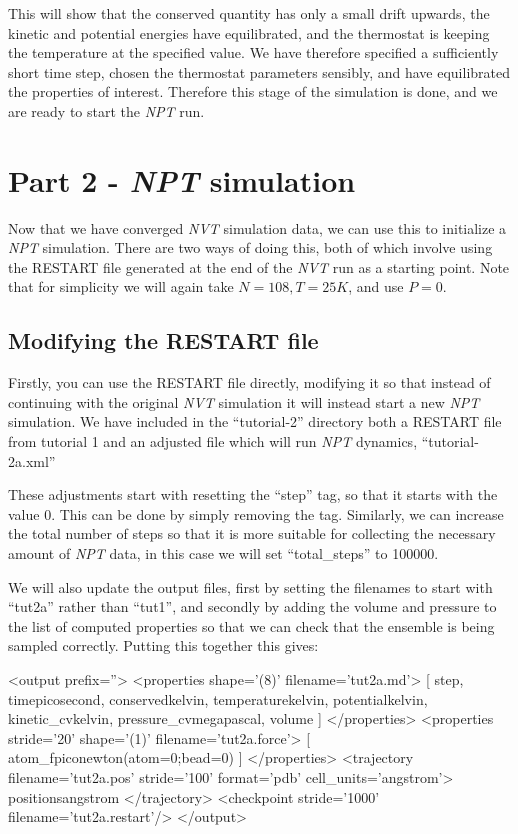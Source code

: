 \documentclass[11pt,english,fleqn]{report}
\newenvironment{code}{%
\footnotesize 
\verbatim
}{
\endverbatim
\normalsize
}
\begin{document}
This will show that the conserved quantity has only a small drift upwards,
the kinetic and potential energies have equilibrated, and the thermostat
is keeping the temperature at the specified value.
We have therefore specified a sufficiently short time step, chosen the
thermostat parameters sensibly, and have equilibrated the properties
of interest.
Therefore this stage of the simulation is done, and we are ready
to start the \emph{NPT} run.

\section{Part 2 - \emph{NPT} simulation}

\label{part2}

Now that we have converged \emph{NVT} simulation data, we can use this to
initialize a \emph{NPT} simulation. 
There are two ways of doing this,
both of which involve using the RESTART file generated at
the end of the \emph{NVT} run as a starting point.
Note that for simplicity we will again take \(N=108, T=25 K\), and use
\(P=0\).

\subsection{Modifying the RESTART file}

Firstly, you can use the RESTART file directly, modifying it
so that instead of continuing with the original \emph{NVT} simulation
it will instead start a new \emph{NPT} simulation. We have included
in the {}``tutorial-2'' directory both a RESTART file from
tutorial 1 and an adjusted file which will run \emph{NPT} dynamics,
{}``tutorial-2a.xml''

These adjustments start with resetting the {}``step'' tag, so that
it starts with the value 0. This can be done by simply removing the
tag. Similarly, we can increase the total number of
steps so that it is more suitable for collecting the necessary
amount of {\em NPT} data, in this case we will set
{}``total\_steps'' to 100000.

We will also update the output files, first by setting the filenames
to start with {}``tut2a'' rather than {}``tut1'', and secondly by adding
the volume and pressure to the list of computed properties so that
we can check that the ensemble is being sampled correctly.
Putting this together this gives:

\begin{code}
<output prefix=''>
   <properties shape='(8)' filename='tut2a.md'>
      [ step, time{picosecond}, conserved{kelvin}, 
        temperature{kelvin}, potential{kelvin}, kinetic_cv{kelvin}, 
        pressure_cv{megapascal}, volume ] 
   </properties>
   <properties stride='20' shape='(1)' filename='tut2a.force'> 
      [ atom_f{piconewton}(atom=0;bead=0) ] 
   </properties>
   <trajectory filename='tut2a.pos' stride='100' format='pdb' cell_units='angstrom'>
      positions{angstrom}
   </trajectory>
   <checkpoint stride='1000' filename='tut2a.restart'/>
</output>
\end{code}
\end{document}
